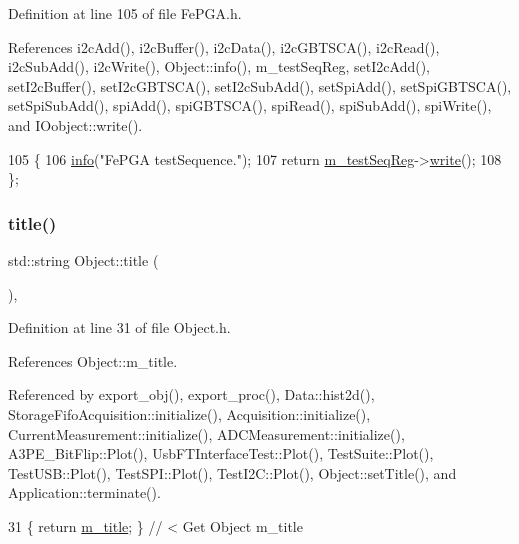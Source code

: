 Definition at line 105 of file Fe\+P\+G\+A.\+h.



References i2c\+Add(), i2c\+Buffer(), i2c\+Data(), i2c\+G\+B\+T\+S\+C\+A(), i2c\+Read(), i2c\+Sub\+Add(), i2c\+Write(), Object\+::info(), m\+\_\+test\+Seq\+Reg, set\+I2c\+Add(), set\+I2c\+Buffer(), set\+I2c\+G\+B\+T\+S\+C\+A(), set\+I2c\+Sub\+Add(), set\+Spi\+Add(), set\+Spi\+G\+B\+T\+S\+C\+A(), set\+Spi\+Sub\+Add(), spi\+Add(), spi\+G\+B\+T\+S\+C\+A(), spi\+Read(), spi\+Sub\+Add(), spi\+Write(), and I\+Oobject\+::write().


\begin{DoxyCode}
105                             \{
106     \hyperlink{classObject_a644fd329ea4cb85f54fa6846484b84a8}{info}(\textcolor{stringliteral}{"FePGA testSequence."});
107     \textcolor{keywordflow}{return} \hyperlink{classFePGA_a67bc3c8f923b673100974fd86096393e}{m\_testSeqReg}->\hyperlink{classIOobject_a9f6984bc9f0fadcf800f1be2523ac744}{write}();
108   \};
\end{DoxyCode}
\mbox{\label{classObject_a73a0f1a41828fdd8303dd662446fb6c3}} 
\subsubsection{\texorpdfstring{title()}{title()}}
{\footnotesize\ttfamily std\+::string Object\+::title (\begin{DoxyParamCaption}{ }\end{DoxyParamCaption})\hspace{0.3cm}{\ttfamily [inline]}, {\ttfamily [inherited]}}



Definition at line 31 of file Object.\+h.



References Object\+::m\+\_\+title.



Referenced by export\+\_\+obj(), export\+\_\+proc(), Data\+::hist2d(), Storage\+Fifo\+Acquisition\+::initialize(), Acquisition\+::initialize(), Current\+Measurement\+::initialize(), A\+D\+C\+Measurement\+::initialize(), A3\+P\+E\+\_\+\+Bit\+Flip\+::\+Plot(), Usb\+F\+T\+Interface\+Test\+::\+Plot(), Test\+Suite\+::\+Plot(), Test\+U\+S\+B\+::\+Plot(), Test\+S\+P\+I\+::\+Plot(), Test\+I2\+C\+::\+Plot(), Object\+::set\+Title(), and Application\+::terminate().


\begin{DoxyCode}
31 \{ \textcolor{keywordflow}{return} \hyperlink{classObject_affbeea1953eb5163573b92fad8f75727}{m\_title};      \} \textcolor{comment}{// < Get Object m\_title}
\end{DoxyCode}
\mbox{\label{classFePGA_ac7698a9f59f7290a6bb648030976597f}} 

